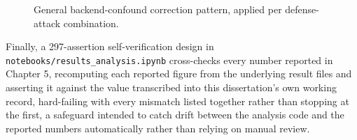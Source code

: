 \begin{figure}[htbp]
\centering
{}
\caption{General backend-confound correction pattern, applied per defense-attack combination.}
\label{fig:backend-confound}
\end{figure}


Finally, a 297-assertion self-verification design in
\texttt{notebooks/results\_analysis.ipynb} cross-checks every number
reported in Chapter 5, recomputing each reported figure from the
underlying result files and asserting it against the value transcribed
into this dissertation's own working record, hard-failing with every
mismatch listed together rather than stopping at the first, a safeguard
intended to catch drift between the analysis code and the reported
numbers automatically rather than relying on manual review.
\FloatBarrier